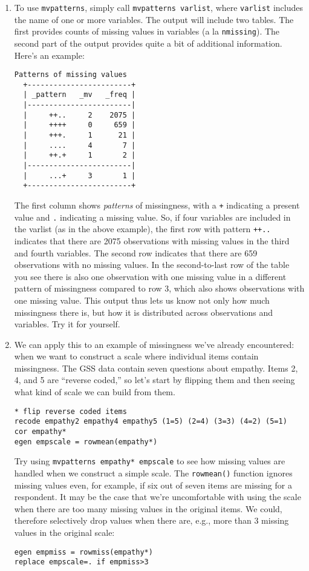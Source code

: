 \documentclass[a4paper,12pt]{article}
\begin{document}
\begin{enumerate}
\item To use \texttt{mvpatterns}, simply call \texttt{mvpatterns varlist}, where \texttt{varlist} includes the name of one or more variables. The output will include two tables. The first provides counts of missing values in variables (a la \texttt{nmissing}). The second part of the output provides quite a bit of additional information. Here's an example:

\begin{verbatim}
Patterns of missing values
  +------------------------+
  | _pattern   _mv   _freq |
  |------------------------|
  |     ++..     2    2075 |
  |     ++++     0     659 |
  |     +++.     1      21 |
  |     ....     4       7 |
  |     ++.+     1       2 |
  |------------------------|
  |     ...+     3       1 |
  +------------------------+
\end{verbatim}

The first column shows {\em patterns} of missingness, with a \texttt{+} indicating a present value and \texttt{.} indicating a missing value. So, if four variables are included in the varlist (as in the above example), the first row with pattern \texttt{++..} indicates that there are 2075 observations with missing values in the third and fourth variables. The second row indicates that there are 659 observations with no missing values. In the second-to-last row of the table you see there is also one observation with one missing value in a different pattern of missingness compared to row 3, which also shows observations with one missing value. This output thus lets us know not only how much missingness there is, but how it is distributed across observations and variables. Try it for yourself.

\item We can apply this to an example of missingness we've already encountered: when we want to construct a scale where individual items contain missingness. The GSS data contain seven questions about empathy. Items 2, 4, and 5 are ``reverse coded,'' so let's start by flipping them and then seeing what kind of scale we can build from them.
\begin{verbatim}
* flip reverse coded items
recode empathy2 empathy4 empathy5 (1=5) (2=4) (3=3) (4=2) (5=1)
cor empathy*
egen empscale = rowmean(empathy*)
\end{verbatim}

Try using \texttt{mvpatterns empathy* empscale} to see how missing values are handled when we construct a simple scale. The \texttt{rowmean()} function ignores missing values even, for example, if six out of seven items are missing for a respondent. It may be the case that we're uncomfortable with using the scale when there are too many missing values in the original items. We could, therefore selectively drop values when there are, e.g., more than 3 missing values in the original scale:
\begin{verbatim}
egen empmiss = rowmiss(empathy*)
replace empscale=. if empmiss>3
\end{verbatim}


\end{enumerate}
\end{document}
